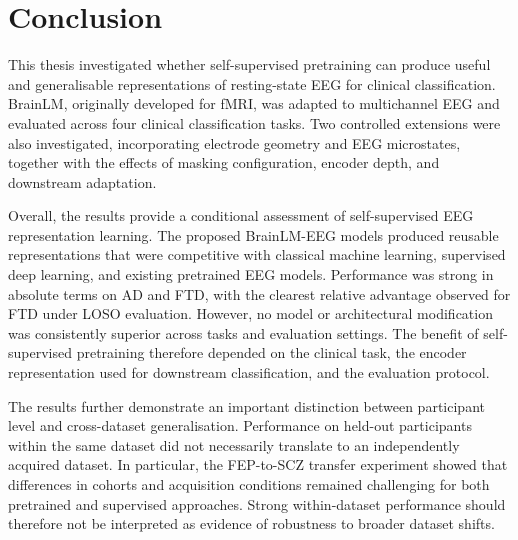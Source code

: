 
\chapter{Conclusion}\label{ch:conclusion}

This thesis investigated whether self-supervised pretraining can produce useful and generalisable representations of resting-state EEG for clinical classification. BrainLM, originally developed for fMRI, was adapted to multichannel EEG and evaluated across four clinical classification tasks. Two controlled extensions were also investigated, incorporating electrode geometry and EEG microstates, together with the effects of masking configuration, encoder depth, and downstream adaptation.

Overall, the results provide a conditional assessment of self-supervised EEG representation learning. The proposed BrainLM-EEG models produced reusable representations that were competitive with classical machine learning, supervised deep learning, and existing pretrained EEG models. Performance was strong in absolute terms on AD and FTD, with the clearest relative advantage observed for FTD under LOSO evaluation. However, no model or architectural modification was consistently superior across tasks and evaluation settings. The benefit of self-supervised pretraining therefore depended on the clinical task, the encoder representation used for downstream classification, and the evaluation protocol.


The results further demonstrate an important distinction between participant level and cross-dataset generalisation. Performance on held-out participants within the same dataset did not necessarily translate to an independently acquired dataset. In particular, the FEP-to-SCZ transfer experiment showed that differences in cohorts and acquisition conditions remained challenging for both pretrained and supervised approaches. Strong within-dataset performance should therefore not be interpreted as evidence of robustness to broader dataset shifts.


